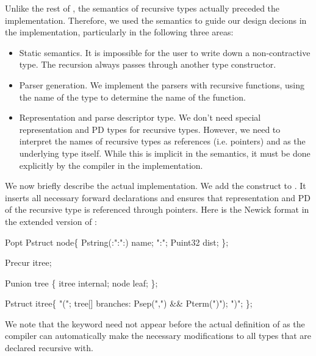 Unlike the rest of \ipads{}, the semantics of recursive types actually
preceded the implementation. Therefore, we used the semantics to guide
our design decions in the implementation, particularly in the
following three areas:
\begin{itemize}
\item Static semantics. It is impossible for the user to write down a
  non-contractive type. The recursion always passes through another
  type constructor.
\item Parser generation. We implement the parsers with recursive
  functions, using the name of the type to determine the name of the
  function.
\item Representation and parse descriptor type. We don't need
  special representation and PD types for recursive types. However, we
  need to interpret the names of recursive types as references
  (i.e. pointers) and as the underlying type itself. While this is
  implicit in the semantics, it must be done explicitly by the
  compiler in the implementation.
\end{itemize}

We now briefly describe the actual implementation. We add the
construct  to \pads{}. It inserts all necessary forward
declarations and ensures that representation and PD of the recursive
type is referenced through pointers. Here is the Newick format in the
extended version of \pads{}:

\begin{code}
Popt Pstruct node\{
  Pstring(:":":) name; ":";
  Puint32 dist;
\};\linebreak

Precur itree;\linebreak

Punion tree \{
  itree internal;
  node leaf;
\};\linebreak

Pstruct itree\{
  "(";
  tree[] branches: Psep(",") && Pterm(")");
  ")";
\};
\end{code}

We note that the  keyword need not appear before the actual
definition of  as the compiler can automatically make the
necessary modifications to all types that are declared recursive
with.

